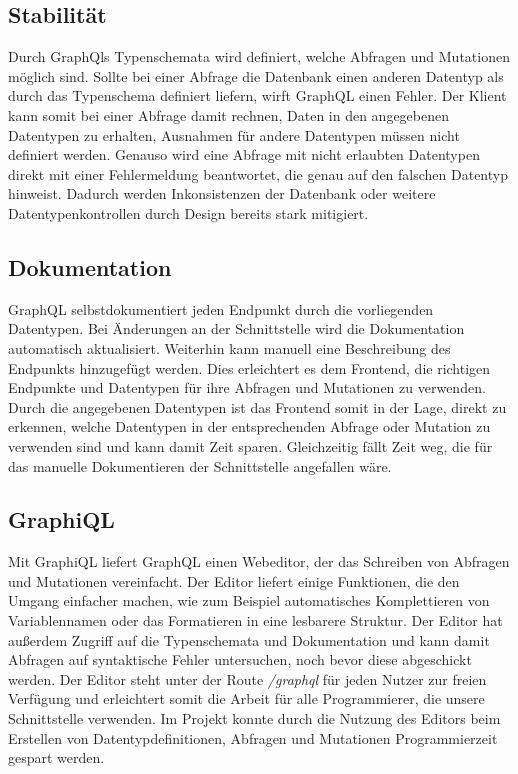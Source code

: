 \subsection{Stabilität}
Durch GraphQls Typenschemata wird definiert, welche Abfragen und Mutationen möglich sind. Sollte bei einer Abfrage die Datenbank einen anderen Datentyp als durch das Typenschema definiert liefern, wirft GraphQL einen Fehler.  Der Klient kann somit bei einer Abfrage damit rechnen, Daten in den angegebenen Datentypen zu erhalten, Ausnahmen für andere Datentypen müssen nicht definiert werden. Genauso wird eine Abfrage mit nicht erlaubten Datentypen direkt mit einer Fehlermeldung beantwortet, die genau auf den falschen Datentyp hinweist. Dadurch werden Inkonsistenzen der Datenbank oder weitere Datentypenkontrollen durch Design bereits stark mitigiert.

\subsection{Dokumentation}
GraphQL selbstdokumentiert jeden Endpunkt durch die vorliegenden Datentypen. Bei Änderungen an der Schnittstelle wird die Dokumentation automatisch aktualisiert. Weiterhin kann manuell eine Beschreibung des Endpunkts hinzugefügt werden.
Dies erleichtert es dem Frontend, die richtigen Endpunkte und Datentypen für ihre Abfragen und Mutationen zu verwenden. Durch die angegebenen Datentypen ist das Frontend somit in der Lage, direkt zu erkennen, welche Datentypen in der entsprechenden Abfrage oder Mutation zu verwenden sind und kann damit Zeit sparen. Gleichzeitig fällt Zeit weg, die für das manuelle Dokumentieren der Schnittstelle angefallen wäre.

\subsection{GraphiQL}
Mit GraphiQL liefert GraphQL einen Webeditor, der das Schreiben von Abfragen und Mutationen vereinfacht. Der Editor liefert einige Funktionen, die den Umgang einfacher machen, wie zum Beispiel automatisches Komplettieren von Variablennamen oder das Formatieren in eine lesbarere Struktur. Der Editor hat außerdem Zugriff auf die Typenschemata und Dokumentation und kann damit Abfragen auf syntaktische Fehler untersuchen, noch bevor diese abgeschickt werden.
Der Editor steht unter der Route \textit{/graphql} für jeden Nutzer zur freien Verfügung und erleichtert somit die Arbeit für alle Programmierer, die unsere Schnittstelle verwenden. Im Projekt konnte durch die Nutzung des Editors beim Erstellen von Datentypdefinitionen, Abfragen und Mutationen Programmierzeit gespart werden.

